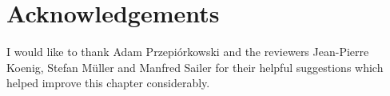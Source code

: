 \documentclass[output=paper
                ,modfonts
                ,nonflat
	        ,collection
	        ,collectionchapter
	        ,collectiontoclongg
 	        ,biblatex
                ,babelshorthands
                ,newtxmath
                ,draftmode
                ,colorlinks, citecolor=brown
]{./langsci/langscibook}
\begin{document}
{%












\section*{Acknowledgements}

I would like to thank Adam Przepi\'orkowski and the reviewers
Jean-Pierre Koenig, Stefan M\"uller and Manfred Sailer for their
helpful suggestions which helped improve this chapter considerably.


\printbibliography[heading=subbibliography,notkeyword=this]

}
\end{document}
